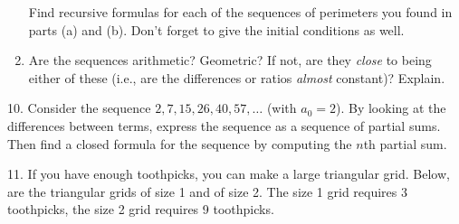 \documentclass[10pt,]{book}
\theoremstyle{plain}
\theoremstyle{definition}
\theoremstyle{definition}
\theoremstyle{definition}
\theoremstyle{definition}
\numberwithin{equation}{chapter}
\newlength{\panelmax}
\begin{document}
\begin{exerciselist}
\begin{enumerate}[label=(\alph*)]
Find recursive formulas for each of the sequences of perimeters you found in parts (a) and (b). Don't forget to give the initial conditions as well. %
\item\hypertarget{li-128}{}\hypertarget{p-214}{}%
Are the sequences arithmetic? Geometric? If not, are they \emph{close} to being either of these (i.e., are the differences or ratios \emph{almost} constant)? Explain. %
\end{enumerate}
%
\par\smallskip
\item[10.]\hypertarget{exercise-19}{}\hypertarget{p-215}{}%
Consider the sequence \(2, 7, 15, 26, 40, 57, \ldots\) (with \(a_0 = 2\)). By looking at the differences between terms, express the sequence as a sequence of partial sums. Then find a closed formula for the sequence by computing the \(n\)th partial sum.%
\par\smallskip
\item[11.]\hypertarget{exercise-20}{}\hypertarget{p-217}{}%
If you have enough toothpicks, you can make a large triangular grid. Below, are the triangular grids of size 1 and of size 2. The size 1 grid requires 3 toothpicks, the size 2 grid requires 9 toothpicks.%
{%
\setlength{\panelmax}{0pt}
\ifdefined\panelboxAimage\else\newsavebox{\panelboxAimage}\fi%
\begin{lrbox}{\panelboxAimage}
\end{lrbox}
\ifdefined\phAimage\else\newlength{\phAimage}\fi%
\setlength{\phAimage}{\ht\panelboxAimage+\dp\panelboxAimage}
\settototalheight{\phAimage}{\usebox{\panelboxAimage}}
\setlength{\panelmax}{\maxof{\panelmax}{\phAimage}}
\ifdefined\panelboxBimage\else\newsavebox{\panelboxBimage}\fi%
\begin{lrbox}{\panelboxBimage}
\end{lrbox}}
\end{exerciselist}
\end{document}
